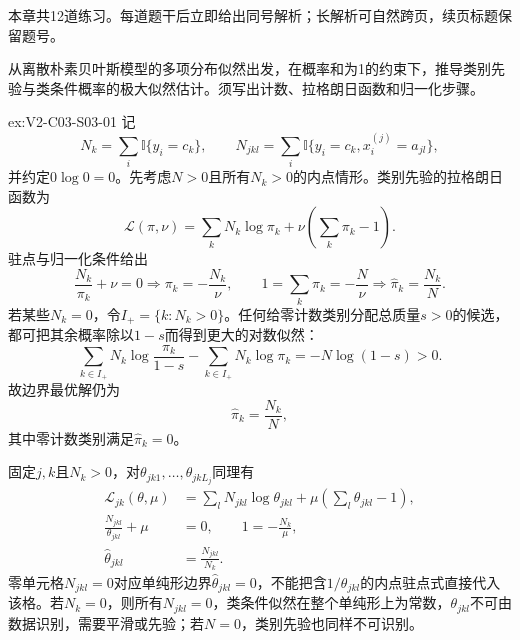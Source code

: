 \label{struct:V2-C03-CH34}
\begin{chapterexercisebox}
\label{struct:V2-C03-CH35}
本章共12道练习。每道题干后立即给出同号解析；长解析可自然跨页，续页标题保留题号。
\end{chapterexercisebox}

\begin{SLChapterExercisePairSection}

\SLSourceBookExercises

\begin{exercise}\label{ex:V2-C03-S03-01}
从离散朴素贝叶斯模型的多项分布似然出发，在概率和为1的约束下，推导类别先验与类条件概率的极大似然估计。须写出计数、拉格朗日函数和归一化步骤。
\end{exercise}
\ifSLFullEdition
{}\label{sol:V2-C03-S03-01}
\begin{chapterexercisesolution}{ex:V2-C03-S03-01}
记
\[
N_k=\sum_i\mathbb I\{y_i=c_k\},
\qquad
N_{jkl}=\sum_i\mathbb I\{y_i=c_k,x_i^{(j)}=a_{jl}\},
\]
并约定$0\log0=0$。先考虑$N>0$且所有$N_k>0$的内点情形。类别先验的拉格朗日函数为
\[
\mathcal L(\pi,\nu)=\sum_kN_k\log\pi_k+\nu\left(\sum_k\pi_k-1\right).
\]
驻点与归一化条件给出
\[
\frac{N_k}{\pi_k}+\nu=0
\Longrightarrow
\pi_k=-\frac{N_k}{\nu},
\qquad
1=\sum_k\pi_k=-\frac{N}{\nu}
\Longrightarrow
\widehat\pi_k=\frac{N_k}{N}.
\]
若某些$N_k=0$，令$I_+=\{k:N_k>0\}$。任何给零计数类别分配总质量$s>0$的候选，都可把其余概率除以$1-s$而得到更大的对数似然：
\[
\sum_{k\in I_+}N_k\log\frac{\pi_k}{1-s}
-\sum_{k\in I_+}N_k\log\pi_k
=-N\log(1-s)>0.
\]
故边界最优解仍为
\[
\widehat\pi_k=\frac{N_k}{N},
\]
其中零计数类别满足$\widehat\pi_k=0$。

固定$j,k$且$N_k>0$，对$\theta_{jk1},\ldots,\theta_{jkL_j}$同理有
\[
\begin{aligned}
\mathcal L_{jk}(\theta,\mu)
&=\sum_lN_{jkl}\log\theta_{jkl}
 +\mu\left(\sum_l\theta_{jkl}-1\right),\\
\frac{N_{jkl}}{\theta_{jkl}}+\mu&=0,
\qquad
1=-\frac{N_k}{\mu},\\
\widehat\theta_{jkl}&=\frac{N_{jkl}}{N_k}.
\end{aligned}
\]
零单元格$N_{jkl}=0$对应单纯形边界$\widehat\theta_{jkl}=0$，不能把含$1/\theta_{jkl}$的内点驻点式直接代入该格。若$N_k=0$，则所有$N_{jkl}=0$，类条件似然在整个单纯形上为常数，$\theta_{jkl}$不可由数据识别，需要平滑或先验；若$N=0$，类别先验也同样不可识别。
\end{chapterexercisesolution}
\fi


\end{SLChapterExercisePairSection}
